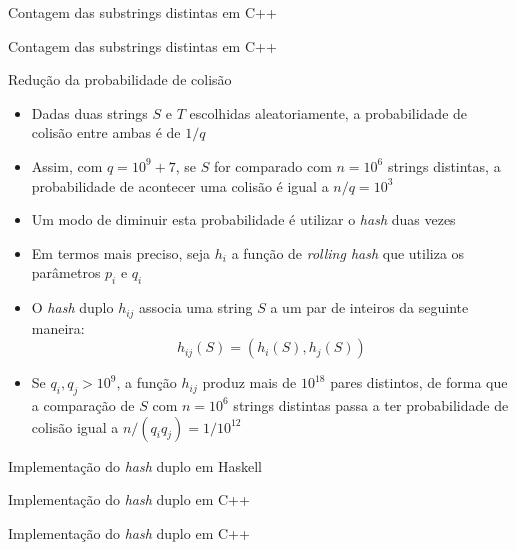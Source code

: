 \begin{frame}[fragile]{Contagem das substrings distintas em C++}
\end{frame}

\begin{frame}[fragile]{Contagem das substrings distintas em C++}
\end{frame}

\begin{frame}[fragile]{Redução da probabilidade de colisão}

    \begin{itemize}
        \item Dadas duas strings $S$ e $T$ escolhidas aleatoriamente, a probabilidade de
            colisão entre ambas é de $1/q$

        \item Assim, com $q = 10^9 + 7$, se $S$ for comparado com $n = 10^6$ strings distintas,
            a probabilidade de acontecer uma colisão é igual a $n/q = 10^3$

        \item Um modo de diminuir esta probabilidade é utilizar o \textit{hash} duas vezes

        \item Em termos mais preciso, seja $h_i$ a função de \textit{rolling hash} que utiliza
            os parâmetros $p_i$ e $q_i$

        \item O \textit{hash} duplo $h_{ij}$ associa uma string $S$ a um par de inteiros da 
            seguinte maneira:
            \[
                h_{ij}(S) = (h_i(S), h_j(S))
            \]

        \item Se $q_i, q_j > 10^9$, a função $h_{ij}$ produz mais de $10^{18}$ pares distintos,
            de forma que a comparação de $S$ com $n = 10^6$ strings distintas passa a ter
            probabilidade de colisão igual a $n/(q_iq_j) = 1/10^{12}$
    \end{itemize}

\end{frame}

\begin{frame}[fragile]{Implementação do {\it hash} duplo em Haskell}
\end{frame}

\begin{frame}[fragile]{Implementação do {\it hash} duplo em C++}
\end{frame}

\begin{frame}[fragile]{Implementação do {\it hash} duplo em C++}
\end{frame}
